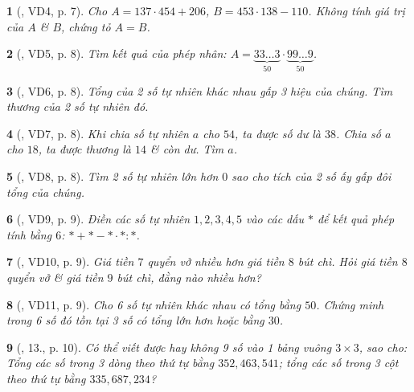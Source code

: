 \documentclass{article}
\newtheorem{baitoan}{}
\begin{document}
\begin{baitoan}[\cite{Binh_Toan_6_tap_1}, VD4, p. 7]
	Cho $A = 137\cdot454 + 206$, $B = 453\cdot138 - 110$. Không tính giá trị của $A$ \& $B$, chứng tỏ $A = B$.
\end{baitoan}

\begin{baitoan}[\cite{Binh_Toan_6_tap_1}, VD5, p. 8]
	Tìm kết quả của phép nhân: $A = \underbrace{33\ldots3}_{50}\cdot\underbrace{99\ldots9}_{50}$.
\end{baitoan}

\begin{baitoan}[\cite{Binh_Toan_6_tap_1}, VD6, p. 8]
	Tổng của 2 số tự nhiên khác nhau gấp 3 hiệu của chúng. Tìm thương của 2 số tự nhiên đó.
\end{baitoan}

\begin{baitoan}[\cite{Binh_Toan_6_tap_1}, VD7, p. 8]
	Khi chia số tự nhiên $a$ cho $54$, ta được số dư là $38$. Chia số $a$ cho $18$, ta được thương là $14$ \& còn dư. Tìm $a$.
\end{baitoan}

\begin{baitoan}[\cite{Binh_Toan_6_tap_1}, VD8, p. 8]
	Tìm 2 số tự nhiên lớn hơn $0$ sao cho tích của 2 số ấy gấp đôi tổng của chúng.
\end{baitoan}

\begin{baitoan}[\cite{Binh_Toan_6_tap_1}, VD9, p. 9]
	Điền các số tự nhiên $1,2,3,4,5$ vào các dấu $*$ để kết quả phép tính bằng $6$:  $*+*-*\cdot*:*$.
\end{baitoan}

\begin{baitoan}[\cite{Binh_Toan_6_tap_1}, VD10, p. 9]
	Giá tiền $7$ quyển vở nhiều hơn giá tiền $8$ bút chì. Hỏi giá tiền $8$ quyển vở \& giá tiền $9$ bút chì, đằng nào nhiều hơn?
\end{baitoan}

\begin{baitoan}[\cite{Binh_Toan_6_tap_1}, VD11, p. 9]
	Cho 6 số tự nhiên khác nhau có tổng bằng $50$. Chứng minh trong 6 số đó tồn tại 3 số có tổng lớn hơn hoặc bằng $30$.	
\end{baitoan}

\begin{baitoan}[\cite{Binh_Toan_6_tap_1}, 13., p. 10]
	Có thể viết được hay không 9 số vào 1 bảng vuông $3\times 3$, sao cho: Tổng các số trong 3 dòng theo thứ tự bằng $352, 463, 541$; tổng các số trong 3 cột theo thứ tự bằng $335, 687, 234$?
\end{baitoan}
\end{document}
